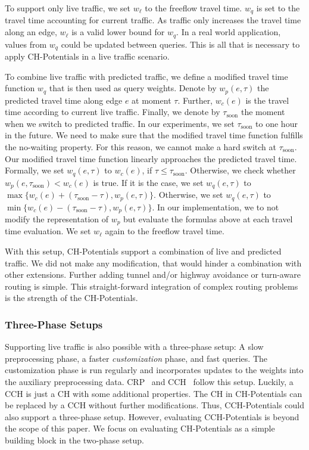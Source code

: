 \documentclass[a4paper,UKenglish,cleveref, autoref, thm-restate]{lipics-v2021}
\begin{document}
To support only live traffic, we set $w_\ell$ to the freeflow travel time.
$w_q$ is set to the travel time accounting for current traffic.
As traffic only increases the travel time along an edge, $w_\ell$ is a valid lower bound for $w_q$.
In a real world application, values from $w_q$ could be updated between queries.
This is all that is necessary to apply CH-Potentials in a live traffic scenario.

To combine live traffic with predicted traffic, we define a modified travel time function $w_q$ that is then used as query weights.
Denote by $w_p(e,\tau)$ the predicted travel time along edge $e$ at moment $\tau$.
Further, $w_c(e)$ is the travel time according to current live traffic.
Finally, we denote by $\tau_{\mathrm{soon}}$ the moment when we switch to predicted traffic.
In our experiments, we set $\tau_{\mathrm{soon}}$ to one hour in the future.
We need to make sure that the modified travel time function fulfills the no-waiting property.
For this reason, we cannot make a hard switch at $\tau_{\mathrm{soon}}$.
Our modified travel time function linearly approaches the predicted travel time. %
%
Formally, we set $w_q(e,\tau)$ to $w_c(e)$, if $\tau \leq \tau_{\mathrm{soon}}$.
Otherwise, we check whether $w_p(e,\tau_{\mathrm{soon}}) < w_c(e)$ is true.
If it is the case, we set $w_q(e,\tau)$ to $\max\{w_c(e)+(\tau_{\mathrm{soon}}-\tau), w_p(e,\tau)\}$.
Otherwise, we set $w_q(e,\tau)$ to $\min\{w_c(e)-(\tau_{\mathrm{soon}}-\tau), w_p(e,\tau)\}$.
In our implementation, we to not modify the representation of $w_p$ but evaluate the formulas above at each travel time evaluation.
We set $w_\ell$ again to the freeflow travel time.

With this setup, CH-Potentials support a combination of live and predicted traffic.
We did not make any modification, that would hinder a combination with other extensions.
Further adding tunnel and/or highway avoidance or turn-aware routing is simple.
This straight-forward integration of complex routing problems is the strength of the CH-Potentials.

\subsubsection{Three-Phase Setups}

Supporting live traffic is also possible with a three-phase setup:
A slow preprocessing phase, a faster \emph{customization} phase, and fast queries.
The customization phase is run regularly and incorporates updates to the weights into the auxiliary preprocessing data.
CRP~\cite{dgpw-crprn-13} and CCH~\cite{dsw-cch-15} follow this setup.
Luckily, a CCH is just a CH with some additional properties.
The CH in CH-Potentials can be replaced by a CCH without further modifications.
Thus, CCH-Potentials could also support a three-phase setup.
However, evaluating CCH-Potentials is beyond the scope of this paper.
We focus on evaluating CH-Potentials as a simple building block in the two-phase setup.
\end{document}
